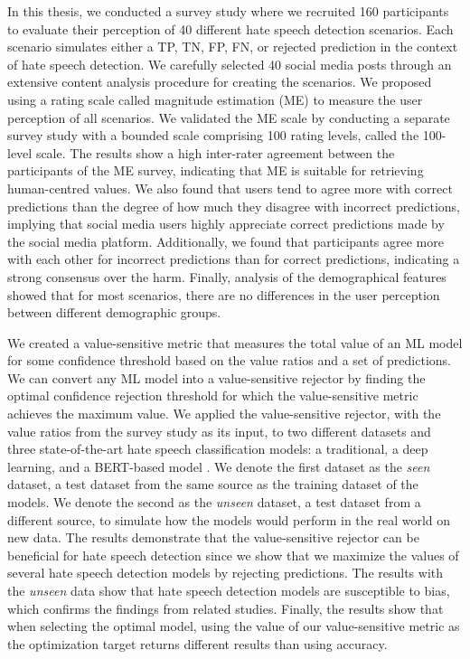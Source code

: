 %
In this thesis, we conducted a survey study where we recruited 160 participants to evaluate their perception of 40 different hate speech detection scenarios.
%
Each scenario simulates either a TP, TN, FP, FN, or rejected prediction in the context of hate speech detection.
%
We carefully selected 40 social media posts through an extensive content analysis procedure for creating the scenarios.
%
We proposed using a rating scale called magnitude estimation (ME) to measure the user perception of all scenarios.
%
We validated the ME scale by conducting a separate survey study with a bounded scale comprising 100 rating levels, called the 100-level scale.
%
The results show a high inter-rater agreement between the participants of the ME survey, indicating that ME is suitable for retrieving human-centred values.
%
We also found that users tend to agree more with correct predictions than the degree of how much they disagree with incorrect predictions, implying that social media users highly appreciate correct predictions made by the social media platform.
%
Additionally, we found that participants agree more with each other for incorrect predictions than for correct predictions, indicating a strong consensus over the harm.
%
Finally, analysis of the demographical features showed that for most scenarios, there are no differences in the user perception between different demographic groups.
%

%
We created a value-sensitive metric that measures the total value of an ML model for some confidence threshold based on the value ratios and a set of predictions.
%
We can convert any ML model into a value-sensitive rejector by finding the optimal confidence rejection threshold for which the value-sensitive metric achieves the maximum value.
%
We applied the value-sensitive rejector, with the value ratios from the survey study as its input, to two different datasets and three state-of-the-art hate speech classification models: a traditional, a deep learning, and a BERT-based model \citep{devlin2018bert}.
%
We denote the first dataset as the \emph{seen} dataset, a test dataset from the same source as the training dataset of the models.
%
We denote the second as the \emph{unseen} dataset, a test dataset from a different source, to simulate how the models would perform in the real world on new data.
%
The results demonstrate that the value-sensitive rejector can be beneficial for hate speech detection since we show that we maximize the values of several hate speech detection models by rejecting predictions.
%
The results with the \emph{unseen} data show that hate speech detection models are susceptible to bias, which confirms the findings from related studies.
%
Finally, the results show that when selecting the optimal model, using the value of our value-sensitive metric as the optimization target returns different results than using accuracy.
%

